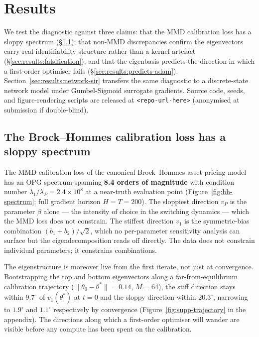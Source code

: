 \section{Results}
\label{sec:results}

We test the diagnostic against three claims: that the MMD calibration
loss has a sloppy spectrum (\S\ref{sec:results:bh-spectrum}); that
non-MMD discrepancies confirm the eigenvectors carry real
identifiability structure rather than a kernel artefact
(\S\ref{sec:results:falsification}); and that the eigenbasis predicts
the direction in which a first-order optimiser fails
(\S\ref{sec:results:predicts-adam}).
Section~\ref{sec:results:network-sir} transfers the same diagnostic to
a discrete-state network model under Gumbel-Sigmoid surrogate
gradients. Source code, seeds, and figure-rendering scripts are
released at \texttt{<repo-url-here>} (anonymised at submission if
double-blind).

\subsection{The Brock--Hommes calibration loss has a sloppy spectrum}
\label{sec:results:bh-spectrum}

The MMD-calibration loss of the canonical Brock--Hommes asset-pricing
model \citep{brock_hommes_1997,brock_hommes_1998} has an OPG spectrum
spanning \textbf{8.4 orders of magnitude} with condition number
$\lambda_1 / \lambda_P = 2.4 \times 10^8$ at a near-truth evaluation
point (Figure~\ref{fig:bh-spectrum}; full gradient horizon $H = T = 200$).
The sloppiest direction $v_P$ is the parameter $\beta$ alone --- the
intensity of choice in the switching dynamics --- which the MMD loss
does not constrain. The stiffest direction $v_1$ is the symmetric-bias
combination $(b_1 + b_2)/\sqrt{2}$, which no per-parameter sensitivity
analysis can surface but the eigendecomposition reads off directly.
The data does not constrain individual parameters; it constrains
combinations.

The eigenstructure is moreover live from the first iterate, not just
at convergence. Bootstrapping the top and bottom eigenvectors along a
far-from-equilibrium calibration trajectory
($\|\theta_0 - \theta^*\| = 0.14$, $M=64$), the stiff direction stays
within $9.7^\circ$ of $v_1(\theta^*)$ at $t=0$ and the sloppy
direction within $20.3^\circ$, narrowing to $1.9^\circ$ and
$1.1^\circ$ respectively by convergence
(Figure~\ref{fig:supp-trajectory} in the appendix). The directions
along which a first-order optimiser will wander are visible before any
compute has been spent on the calibration.

